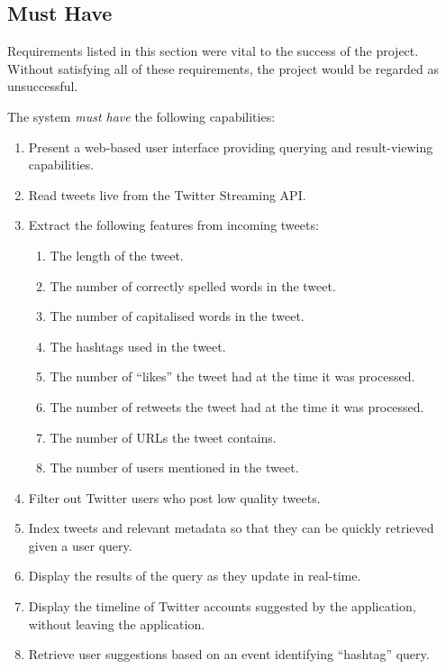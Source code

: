 \documentclass{l4proj}
\begin{document}
    \subsection{Must Have}
    
    Requirements listed in this section were vital to the success of the project. Without satisfying all of these requirements, the project would be regarded as unsuccessful. 
  
    The system \textit{must have} the following capabilities:
    \begin{enumerate}[label=\textbf{M.\arabic*}]
    \item Present a web-based user interface providing querying and result-viewing capabilities.
    \item Read tweets live from the Twitter Streaming API.
    \item Extract the following features from incoming tweets:
        \begin{enumerate}
        \item The length of the tweet.
        \item The number of correctly spelled words in the tweet.
        \item The number of capitalised words in the tweet.
        \item The hashtags used in the tweet.
        \item The number of ``likes'' the tweet had at the time it was processed. 
        \item The number of retweets the tweet had at the time it was processed.
        \item The number of URLs the tweet contains.
        \item The number of users mentioned in the tweet.
        \end{enumerate} 
    \item Filter out Twitter users who post low quality tweets.
   \item Index tweets and relevant metadata so that they can be quickly retrieved given a user query.
   
   \item Display the results of the query as they update in real-time.
   \item Display the timeline of Twitter accounts suggested by the application, without leaving the application. 
   \item Retrieve user suggestions based on an event identifying ``hashtag'' query.
    \end{enumerate}
    
\end{document}
